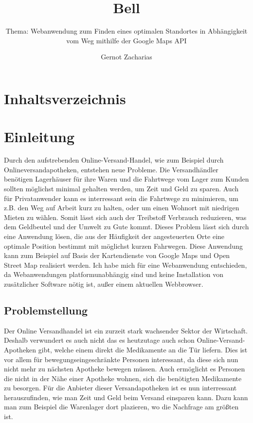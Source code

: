 \documentclass[a4paper, twoside, 12pt]{scrreprt}
\title{Bell}
\author{Gernot Zacharias}
\subtitle{Thema: Webanwendung zum Finden eines optimalen Standortes in Abhängigkeit vom Weg mithilfe der Google Maps API}
\begin{document}
\listoftodos
\maketitle
\cleardoublepage
\chapter {Inhaltsverzeichnis}

\setcounter{page}{1}
\chapter {Einleitung}
Durch den aufstrebenden Online-Versand-Handel, wie zum Beispiel durch Onlineversandapotheken, entstehen neue Probleme.
Die Versandhändler benötigen Lagerhäuser für ihre Waren und die Fahrtwege vom Lager zum Kunden sollten möglichst minimal gehalten werden,
um Zeit und Geld zu sparen. Auch für Privatanwender kann es interressant sein die Fahrtwege zu minimieren, um z.B. den Weg auf Arbeit kurz zu halten, oder
um einen Wohnort mit niedrigen Mieten zu wählen. Somit lässt sich auch der Treibstoff Verbrauch reduzieren, was dem Geldbeutel und der Umwelt zu Gute kommt.
Dieses Problem lässt sich durch eine Anwendung lösen, die aus der Häufigkeit der angesteuerten Orte eine optimale Position bestimmt mit möglichst 
kurzen Fahrwegen. Diese Anwendung kann zum Beispiel auf Basis  der Kartendienste von Google Maps und Open Street Map realisiert werden.
Ich habe mich für eine Webanwendung entschieden, da Webanwendungen platformunabhängig sind und keine Installation von zusätzlicher Software nötig ist, außer 
einem aktuellen Webbrowser.
\cleardoublepage
\section {Problemstellung}
Der Online Versandhandel ist ein zurzeit stark wachsender Sektor der Wirtschaft.
Deshalb verwundert es auch nicht das es heutzutage auch schon Online-Versand-Apotheken gibt, welche einem direkt die Medikamente an die Tür liefern.
Dies ist vor allem für bewegungseingeschränkte Personen interessant, da diese sich nun nicht mehr zu nächsten Apotheke bewegen müssen.
Auch ermöglicht es Personen die nicht in der Nähe einer Apotheke wohnen, sich die benötigten Medikamente zu besorgen.
Für die Anbieter dieser Versandapotheken ist es nun interressant herauszufinden, wie man Zeit und Geld beim Versand einsparen kann.
Dazu kann man zum Beispiel die Warenlager dort plazieren, wo die Nachfrage am größten ist.
\end{document}
